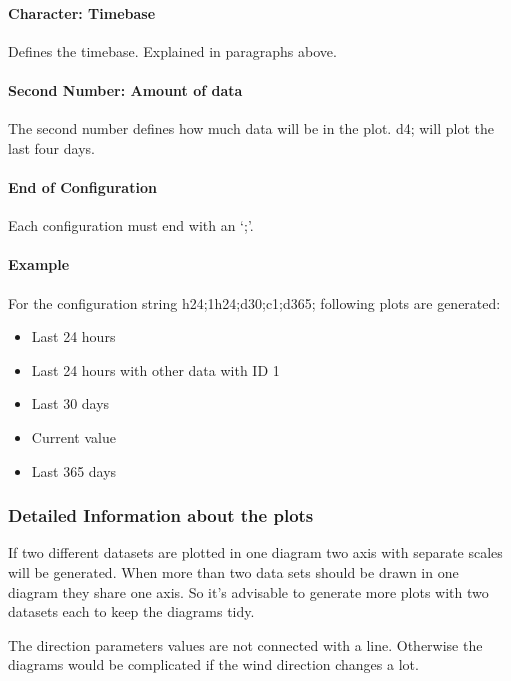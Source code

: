 \paragraph{Character: Timebase} %
\label{par:character}
Defines the timebase. Explained in paragraphs above.
\paragraph{Second Number: Amount of data} %
\label{par:number}
The second number defines how much data will be in the plot. {\C d4;} will plot the last four days.
\paragraph{End of Configuration} %
\label{par:end_of_configuration}
Each configuration must end with an {\C `;'}.

\paragraph{Example} %
\label{par:example}
For the configuration string {\C h24;1h24;d30;c1;d365;} following plots are generated:
\begin{itemize}
	\item Last 24 hours
	\item Last 24 hours with other data with ID 1 
	\item Last 30 days
	\item Current value
	\item Last 365 days
\end{itemize}


\subsubsection{Detailed Information about the plots} %
\label{ssub:detailed_information_about_the_plots}
If two different datasets are plotted in one diagram two axis with separate scales will be generated. When more than two data sets should be drawn in one diagram they share one axis. So it's advisable to generate more plots with two datasets each to keep the diagrams tidy.

The direction parameters values are not connected with a line. Otherwise the diagrams would be complicated if the wind direction changes a lot.


